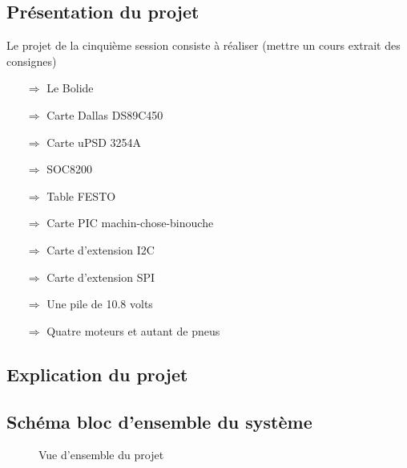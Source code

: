 \documentclass[10pt,a4paper,final]{article}
\begin{document}
\renewcommand\footrulewidth{1pt}
\fancyfoot[R]{\today}
\begin{spacing}{1.5}

\section{Présentation du projet}
Le projet de la cinquième session consiste à réaliser (mettre un cours extrait des consignes)
\begin{itemize}
\item[$\Rightarrow$] Le Bolide
\item[$\Rightarrow$] Carte Dallas DS89C450
\item[$\Rightarrow$] Carte uPSD 3254A
\item[$\Rightarrow$] SOC8200
\item[$\Rightarrow$] Table FESTO
\item[$\Rightarrow$] Carte PIC machin-chose-binouche
\item[$\Rightarrow$] Carte d'extension I{\small 2}C
\item[$\Rightarrow$] Carte d'extension SPI
\item[$\Rightarrow$] Une pile de 10.8 volts
\item[$\Rightarrow$] Quatre moteurs et autant de pneus
\end{itemize}

\subsection{Explication du projet}

\subsection{Schéma bloc d'ensemble du système}

\begin{figure}[hbtp]
\caption{Vue d'ensemble du projet}
\centering
{}
\end{figure}
\vfill
\pagebreak 


\end{spacing}
\end{document}
